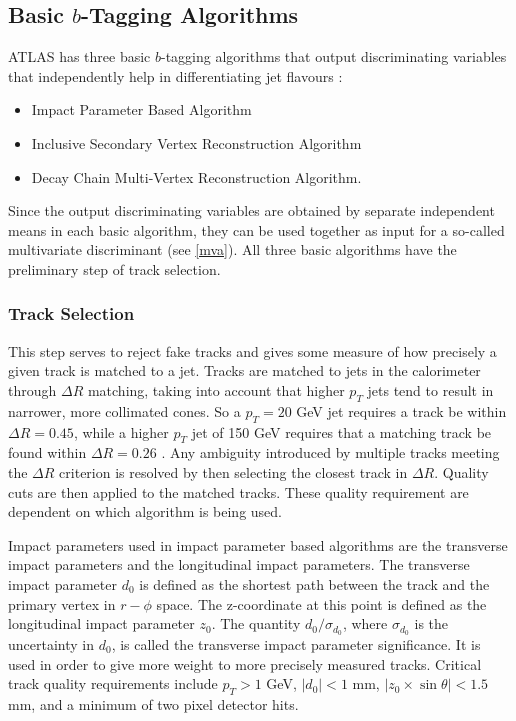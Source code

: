 \subsection{Basic $b$-Tagging Algorithms}
ATLAS has three basic $b$-tagging algorithms that output discriminating variables that independently help in differentiating jet flavours \cite{valerio_on_btagging}:
\begin{itemize}
\item Impact Parameter Based Algorithm
\item Inclusive Secondary Vertex Reconstruction Algorithm
\item Decay Chain Multi-Vertex Reconstruction Algorithm.
\end{itemize}
Since the output discriminating variables are obtained by separate independent means in each basic algorithm, they can be used together as input for a so-called multivariate discriminant (see \ref{mva}). All three basic algorithms have the preliminary step of track selection.
\subsubsection{Track Selection}
This step serves to reject fake tracks and gives some measure of how precisely a given track is matched to a jet. Tracks are matched to jets in the calorimeter through $\Delta R$ matching, taking into account that higher $p_{T}$ jets tend to result in narrower, more collimated cones. So a $p_{T} = 20$ GeV jet requires a track be within $\Delta R = 0.45$, while a higher $p_{T}$ jet of 150 GeV requires that a matching track be found within $\Delta R = 0.26$ \cite{b_tagging_extra}. Any ambiguity introduced by multiple tracks meeting the $\Delta R$ criterion is resolved by then selecting the closest track in $\Delta R$. Quality cuts are then applied to the matched tracks. These quality requirement are dependent on which algorithm is being used.

Impact parameters used in impact parameter based algorithms are the transverse impact parameters and the longitudinal impact parameters. The transverse impact parameter $d_{0}$ is defined as the shortest path between the track and the primary vertex in $r-\phi$ space. The z-coordinate at this point is defined as the longitudinal impact parameter $z_{0}$. The quantity $d_{0}/\sigma_{d_{0}}$, where $\sigma_{d_{0}}$ is the uncertainty in $d_{0}$, is called the transverse impact parameter significance. It is used in order to give more weight to more precisely measured tracks. Critical track quality requirements include $p_{T} > 1$ GeV, $|d_{0}| < 1$ mm, $|z_{0} \times \sin \theta  | < 1.5 $ mm, and a minimum of two pixel detector hits.

